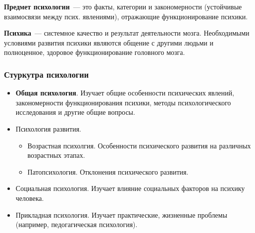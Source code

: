 \textbf{Предмет психологии}~--- это факты, категории и закономерности (устойчивые взаимосвязи между псих. явлениями), отражающие функционирование психики.

\textbf{Психика}~--- системное качество и результат деятельности мозга. Необходимыми условиями развития психики являются общение с другими людьми и полноценное, здоровое функционирование головного мозга.

\subsubsection{Стуркутра психологии}
\begin{itemize}
	\item \textbf{Общая психология}. Изучает общие особенности психических явлений, закономерности функционирования психики, методы психологического исследования и другие общие вопросы.
	\item Психология развития.
		\begin{itemize}
			\item Возрастная психолгия. Особенности психического развития на различных возрастных этапах.
			\item Патопсихология. Отклонения психического развития.
		\end{itemize}
	\item Социальная психология. Изучает влияние социальных факторов на психику человека.
	\item Прикладная психология. Изучает практические, жизненные проблемы (например, педогагическая психология).
\end{itemize}

